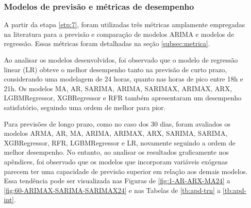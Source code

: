 \subsubsection{Modelos de previs\~ao e m\'etricas de desempenho}\label{subsubsec:modelos}

A partir da etapa \ref{etp:7}, foram utilizadas três métricas amplamente empregadas na literatura para a previsão e comparação de modelos ARIMA e modelos de regressão. Essas métricas foram detalhadas na seção \ref{subsec:metrica}.

Ao analisar os modelos desenvolvidos, foi observado que o modelo de regressão linear (LR) obteve o melhor desempenho tanto na previsão de curto prazo, considerando uma modelagem de 24 horas, quanto nas horas de pico entre 18h e 21h. Os modelos MA, AR, SARIMA, ARIMA, SARIMAX, ARIMAX, ARX, LGBMRegressor, XGBRegressor e RFR também apresentaram um desempenho satisfatório, seguindo uma ordem de melhor para pior.

Para previsões de longo prazo, como no caso dos 30 dias, foram avaliados os modelos ARMA, AR, MA, ARIMA, ARIMAX, ARX, SARIMA, SARIMA, XGBRegressor, RFR, LGBMRegressor e LR, novamente seguindo a ordem de melhor desempenho. No entanto, ao analisar os resultados graficamente nos apêndices, foi observado que os modelos que incorporam variáveis exógenas parecem ter uma capacidade de previsão superior em relação aos demais modelos. Essa tendência pode ser visualizada nas Figuras de \ref{fig:1-AR-ARX-MA24} a \ref{fig:60-ARIMAX-SARIMA-SARIMAX24} e nas Tabelas de \ref{tb:apd-trn} a \ref{tb:apd-int}.
